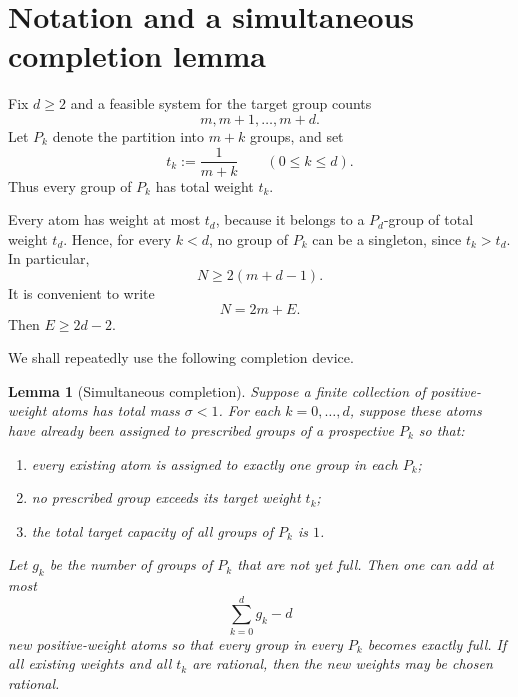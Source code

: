 \documentclass[11pt]{article}
\newtheorem{lemma}[theorem]{Lemma}
\theoremstyle{definition}
\newcommand{\1}{\mathbf{1}}
\begin{document}
\section{Notation and a simultaneous completion lemma}

Fix $d\ge2$ and a feasible system for the target group counts
\[
  m,m+1,\ldots,m+d.
\]
Let $P_k$ denote the partition into $m+k$ groups, and set
\begin{equation}\label{eq:tk}
  t_k:=\frac1{m+k}\qquad(0\le k\le d).
\end{equation}
Thus every group of $P_k$ has total weight $t_k$.

Every atom has weight at most $t_d$, because it belongs to a $P_d$-group of total weight $t_d$.  Hence, for every $k<d$, no group of $P_k$ can be a singleton, since $t_k>t_d$.  In particular,
\begin{equation}\label{eq:elementary-lower}
  N\ge 2(m+d-1).
\end{equation}
It is convenient to write
\begin{equation}\label{eq:E}
  N=2m+E.
\end{equation}
Then $E\ge2d-2$.

We shall repeatedly use the following completion device.

\begin{lemma}[Simultaneous completion]\label{lem:completion}
Suppose a finite collection of positive-weight atoms has total mass $\sigma<1$.  For each $k=0,\ldots,d$, suppose these atoms have already been assigned to prescribed groups of a prospective $P_k$ so that:
\begin{enumerate}[label=\textup{(\roman*)}]
  \item every existing atom is assigned to exactly one group in each $P_k$;
  \item no prescribed group exceeds its target weight $t_k$;
  \item the total target capacity of all groups of $P_k$ is $1$.
\end{enumerate}
Let $g_k$ be the number of groups of $P_k$ that are not yet full.  Then one can add at most
\begin{equation}\label{eq:completion-count}
  \sum_{k=0}^d g_k-d
\end{equation}
new positive-weight atoms so that every group in every $P_k$ becomes exactly full.  If all existing weights and all $t_k$ are rational, then the new weights may be chosen rational.
\end{lemma}
\end{document}
